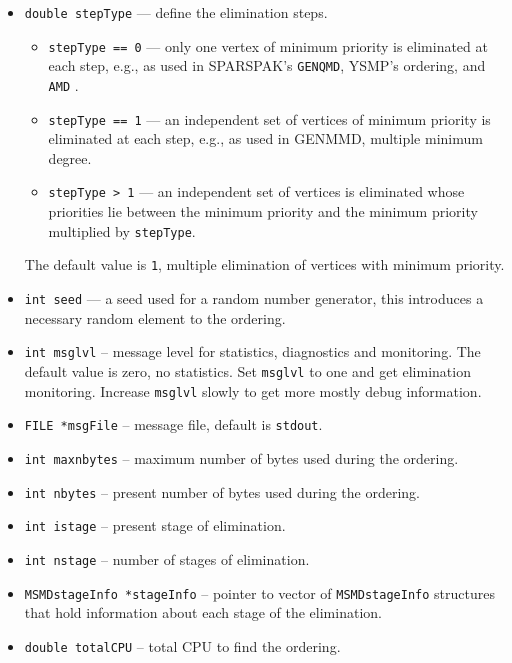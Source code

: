 \begin{itemize}
\item
{\tt double stepType} --- define the elimination steps.
\begin{itemize}
\item
{\tt stepType == 0} 
--- only one vertex of minimum priority is eliminated at each step,
    e.g., as used in SPARSPAK's {\tt GENQMD}, YSMP's ordering,
    and {\tt AMD} \cite{ame96-amd}.
\item
{\tt stepType == 1} 
--- an independent set of vertices of minimum priority is eliminated
at each step, e.g., as used in GENMMD, multiple minimum degree.
\item
{\tt stepType > 1} 
--- an independent set of vertices is eliminated whose priorities
lie between the minimum priority and the minimum priority
multiplied by {\tt stepType}.
\end{itemize}
The default value is {\tt 1}, multiple elimination of vertices with
minimum priority.
\item
{\tt int seed} --- a seed used for a random number generator, this
introduces a necessary random element to the ordering.
\item
{\tt int msglvl} -- message level for statistics, diagnostics and
monitoring. The default value is zero, no statistics.
Set {\tt msglvl} to one and get elimination monitoring.
Increase {\tt msglvl} slowly to get more mostly debug information.
\item
{\tt FILE *msgFile} -- message file, default is {\tt stdout}.
\item
{\tt int maxnbytes} -- maximum number of bytes used during the ordering.
\item
{\tt int nbytes} -- present number of bytes used during the ordering.
\item
{\tt int istage} -- present stage of elimination.
\item
{\tt int nstage} -- number of stages of elimination.
\item
{\tt MSMDstageInfo *stageInfo} -- pointer to vector of
{\tt MSMDstageInfo} structures that hold information about each
stage of the elimination.
\item
{\tt double totalCPU} -- total CPU to find the ordering.
\end{itemize}
\par
